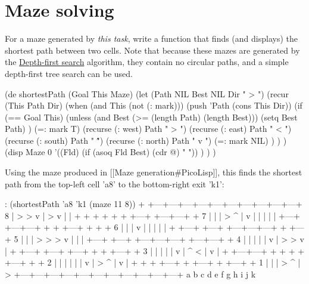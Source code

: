 \pagebreak{}
\section*{Maze solving}

For a maze generated by \emph{this task}, write a function that finds
(and displays) the shortest path between two cells. Note that because
these mazes are generated by the
\href{http://en.wikipedia.org/wiki/Maze\_generation\_algorithm\#Depth-first\_search}{Depth-first
  search} algorithm, they contain no circular paths, and a simple
depth-first tree search can be used.

\begin{wideverbatim}

(de shortestPath (Goal This Maze)
   (let (Path NIL  Best NIL  Dir " > ")
      (recur (This Path Dir)
         (when (and This (not (: mark)))
            (push 'Path (cons This Dir))
            (if (== Goal This)
               (unless (and Best (>= (length Path) (length Best)))
                  (setq Best Path) )
               (=: mark T)
               (recurse (: west) Path " > ")
               (recurse (: east) Path " < ")
               (recurse (: south) Path " \^ ")
               (recurse (: north) Path " v ")
               (=: mark NIL) ) ) )
      (disp Maze 0
         '((Fld) (if (asoq Fld Best) (cdr @) "   ")) ) ) )

Using the maze produced in [[Maze generation#PicoLisp]], this finds the shortest
path from the top-left cell 'a8' to the bottom-right exit 'k1':

: (shortestPath 'a8 'k1 (maze 11 8))
   +   +---+---+---+---+---+---+---+---+---+---+
 8 | >   >   v | >   v |                       |
   +   +   +   +   +   +   +---+   +---+---+   +
 7 |   |   | >   ^ | v |   |       |       |   |
   +---+   +---+---+   +   +   +---+   +   +   +
 6 |   |       |     v |   |           |   |   |
   +   +---+   +---+   +---+---+---+   +   +---+
 5 |       |       | >   >   >   v |   |       |
   +---+   +---+   +---+---+---+   +---+---+   +
 4 |   |       |       |       | v | >   >   v |
   +   +---+   +---+   +---+   +   +   +---+   +
 3 |       |       |   |       | v | ^   < | v |
   +   +---+---+   +   +   +   +   +---+   +   +
 2 |       |       |   |   |   | v | >   ^ | v |
   +   +   +   +---+   +   +---+   +   +---+   +
 1 |   |               |         >   ^ |     >
   +---+---+---+---+---+---+---+---+---+---+---+
     a   b   c   d   e   f   g   h   i   j   k

\end{wideverbatim}


